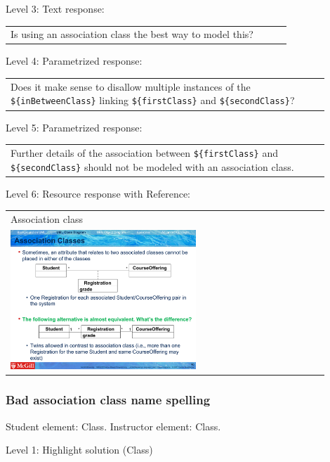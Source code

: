 \noindent Level 3: Text response: \medskip

\begin{tabular}{|p{0.9\linewidth}}
Is using an association class the best way to model this?
\end{tabular} \medskip

\noindent Level 4: Parametrized response: \medskip

\begin{tabular}{|p{0.9\linewidth}}
Does it make sense to disallow multiple instances of the \verb|${inBetweenClass}| linking \verb|${firstClass}| and \verb|${secondClass}|?
\end{tabular} \medskip

\noindent Level 5: Parametrized response: \medskip

\begin{tabular}{|p{0.9\linewidth}}
Further details of the association between \verb|${firstClass}| and \verb|${secondClass}| should not be modeled with an association class.
\end{tabular} \medskip

\noindent Level 6: Resource response with Reference: \medskip

\begin{tabular}{|p{0.9\linewidth}}
Association class

\\
\includegraphics[width=0.6\textwidth]{images/association_class.png}
\end{tabular} \medskip


\subsubsection{Bad association class name spelling}

Student element: Class. Instructor element: Class. \medskip

\noindent Level 1: Highlight solution (Class) \medskip

